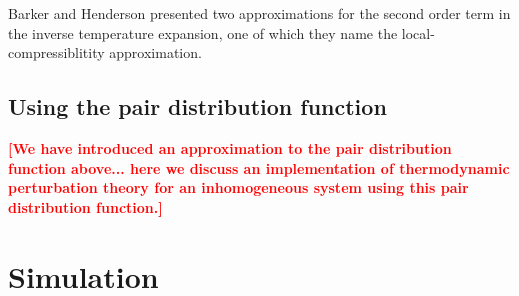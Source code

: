 \documentclass[letterpaper,twocolumn,amsmath,amssymb,pre,aps,10pt]{revtex4-1}
\newcommand\rr{\mathbf{x}}
\newcommand\fixme[1]{\textcolor{red}{\textbf{[#1]}}}
\begin{document}
Barker and Henderson presented two approximations for the second order
term in the inverse temperature expansion, one of which they name the
local-compressiblitity
approximation. \cite{barker2004perturbationSW,barker2004perturbationII}



\subsection{Using the pair distribution function}


\fixme{We have introduced an approximation to the pair distribution
  function above... here we discuss an implementation of thermodynamic
  perturbation theory for an inhomogeneous system using this pair
  distribution function.}


\section{Simulation}
\end{document}

